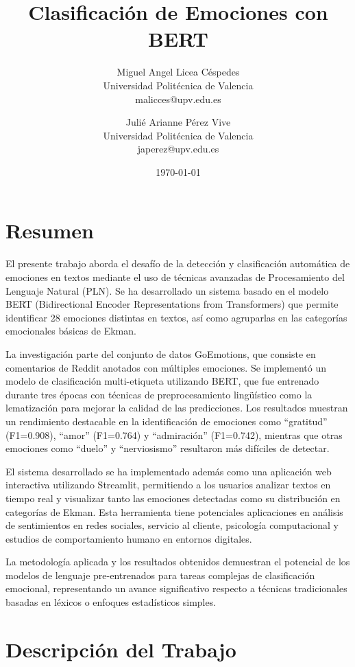 \documentclass[12pt,a4paper]{report}
\title{\Huge \textbf{Clasificación de Emociones con BERT}}
\author{
    \Large Miguel Angel Licea Céspedes \\
    \normalsize Universidad Politécnica de Valencia \\
    \normalsize malicces@upv.edu.es
    \and
    \Large Julié Arianne Pérez Vive  \\
    \normalsize Universidad Politécnica de Valencia \\
    \normalsize japerez@upv.edu.es
}
\date{\today}
\begin{document}
\maketitle
\tableofcontents
\newpage

\chapter*{Resumen}

El presente trabajo aborda el desafío de la detección y clasificación automática de emociones en textos mediante el uso de técnicas avanzadas de Procesamiento del Lenguaje Natural (PLN). Se ha desarrollado un sistema basado en el modelo BERT (Bidirectional Encoder Representations from Transformers) que permite identificar 28 emociones distintas en textos, así como agruparlas en las categorías emocionales básicas de Ekman.

La investigación parte del conjunto de datos GoEmotions, que consiste en comentarios de Reddit anotados con múltiples emociones. Se implementó un modelo de clasificación multi-etiqueta utilizando BERT, que fue entrenado durante tres épocas con técnicas de preprocesamiento lingüístico como la lematización para mejorar la calidad de las predicciones. Los resultados muestran un rendimiento destacable en la identificación de emociones como ``gratitud'' (F1=0.908), ``amor'' (F1=0.764) y ``admiraci\'on'' (F1=0.742), mientras que otras emociones como ``duelo'' y ``nerviosismo'' resultaron más difíciles de detectar.

El sistema desarrollado se ha implementado además como una aplicación web interactiva utilizando Streamlit, permitiendo a los usuarios analizar textos en tiempo real y visualizar tanto las emociones detectadas como su distribución en categorías de Ekman. Esta herramienta tiene potenciales aplicaciones en análisis de sentimientos en redes sociales, servicio al cliente, psicología computacional y estudios de comportamiento humano en entornos digitales.

La metodología aplicada y los resultados obtenidos demuestran el potencial de los modelos de lenguaje pre-entrenados para tareas complejas de clasificación emocional, representando un avance significativo respecto a técnicas tradicionales basadas en léxicos o enfoques estadísticos simples.

\chapter{Descripción del Trabajo}
\end{document}
